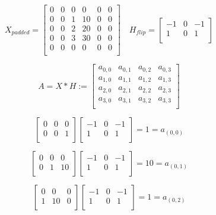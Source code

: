 \documentclass[11pt]{article}
\theoremstyle{plain}
\begin{document}
\[
	X_{padded} =
	\begin{bmatrix}
		0 & 0 & 0 & 0  & 0 & 0 \\
		0 & 0 & 1 & 10 & 0 & 0 \\
		0 & 0 & 2 & 20 & 0 & 0 \\
		0 & 0 & 3 & 30 & 0 & 0 \\
		0 & 0 & 0 & 0  & 0 & 0 \\
	\end{bmatrix} \quad
	H_{flip} =
	\begin{bmatrix}
		-1 & 0 & -1 \\
		1  & 0 & 1  \\
	\end{bmatrix}
\]

\vspace{1em}
\[
	A = X \ast H :=
	\begin{bmatrix}
		a_{0,0} & a_{0,1} & a_{0,2} & a_{0,3} \\
		a_{1,0} & a_{1,1} & a_{1,2} & a_{1,3} \\
		a_{2,0} & a_{2,1} & a_{2,2} & a_{2,3} \\
		a_{3,0} & a_{3,1} & a_{3,2} & a_{3,3} \\
	\end{bmatrix}
\]
\vspace{1em}

\[
	\begin{bmatrix}
		0 & 0 & 0 \\
		0 & 0 & 1 \\
	\end{bmatrix}
	\begin{bmatrix}
		-1 & 0 & -1 \\
		1  & 0 & 1  \\
	\end{bmatrix}
	= 1 = a_{(0,0)}
\]

\[
	\begin{bmatrix}
		0 & 0 & 0  \\
		0 & 1 & 10 \\
	\end{bmatrix}
	\begin{bmatrix}
		-1 & 0 & -1 \\
		1  & 0 & 1  \\
	\end{bmatrix}
	= 10 = a_{(0,1)}
\]

\[
	\begin{bmatrix}
		0 & 0  & 0 \\
		1 & 10 & 0 \\
	\end{bmatrix}
	\begin{bmatrix}
		-1 & 0 & -1 \\
		1  & 0 & 1  \\
	\end{bmatrix}
	= 1 = a_{(0,2)}
\]
\end{document}
